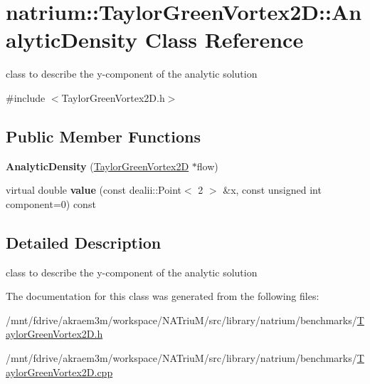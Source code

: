 \hypertarget{classnatrium_1_1TaylorGreenVortex2D_1_1AnalyticDensity}{
\section{natrium::TaylorGreenVortex2D::AnalyticDensity Class Reference}
\label{classnatrium_1_1TaylorGreenVortex2D_1_1AnalyticDensity}
}


class to describe the y-\/component of the analytic solution  


{\ttfamily \#include $<$TaylorGreenVortex2D.h$>$}\subsection*{Public Member Functions}
\begin{DoxyCompactItemize}
\item 
\hypertarget{classnatrium_1_1TaylorGreenVortex2D_1_1AnalyticDensity_aabfcf7599f5e512deed9f227fd46b6e7}{
{\bfseries AnalyticDensity} (\hyperlink{classnatrium_1_1TaylorGreenVortex2D}{TaylorGreenVortex2D} $\ast$flow)}
\label{classnatrium_1_1TaylorGreenVortex2D_1_1AnalyticDensity_aabfcf7599f5e512deed9f227fd46b6e7}

\item 
\hypertarget{classnatrium_1_1TaylorGreenVortex2D_1_1AnalyticDensity_a3bfa3988593be2a124fd393f59e17795}{
virtual double {\bfseries value} (const dealii::Point$<$ 2 $>$ \&x, const unsigned int component=0) const }
\label{classnatrium_1_1TaylorGreenVortex2D_1_1AnalyticDensity_a3bfa3988593be2a124fd393f59e17795}

\end{DoxyCompactItemize}


\subsection{Detailed Description}
class to describe the y-\/component of the analytic solution 

The documentation for this class was generated from the following files:\begin{DoxyCompactItemize}
\item 
/mnt/fdrive/akraem3m/workspace/NATriuM/src/library/natrium/benchmarks/\hyperlink{TaylorGreenVortex2D_8h}{TaylorGreenVortex2D.h}\item 
/mnt/fdrive/akraem3m/workspace/NATriuM/src/library/natrium/benchmarks/\hyperlink{TaylorGreenVortex2D_8cpp}{TaylorGreenVortex2D.cpp}\end{DoxyCompactItemize}
